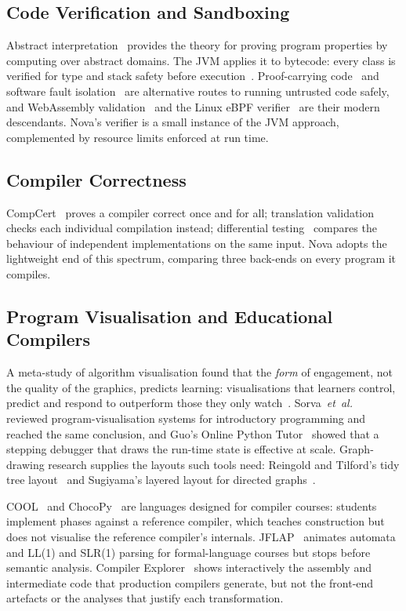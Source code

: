 \documentclass[conference]{IEEEtran}
\begin{document}
\subsection{Code Verification and Sandboxing}
Abstract interpretation~\cite{cousot1977} provides the theory for proving program properties by computing over abstract domains. The JVM applies it to bytecode: every class is verified for type and stack safety before execution~\cite{lindholm2014,leroy2003}. Proof-carrying code~\cite{necula1997} and software fault isolation~\cite{wahbe1993} are alternative routes to running untrusted code safely, and WebAssembly validation~\cite{haas2017} and the Linux eBPF verifier~\cite{gershuni2019} are their modern descendants. Nova's verifier is a small instance of the JVM approach, complemented by resource limits enforced at run time.

\subsection{Compiler Correctness}
CompCert~\cite{leroy2009} proves a compiler correct once and for all; translation validation~\cite{pnueli1998} checks each individual compilation instead; differential testing~\cite{mckeeman1998,yang2011} compares the behaviour of independent implementations on the same input. Nova adopts the lightweight end of this spectrum, comparing three back-ends on every program it compiles.

\subsection{Program Visualisation and Educational Compilers}
A meta-study of algorithm visualisation found that the \emph{form} of engagement, not the quality of the graphics, predicts learning: visualisations that learners control, predict and respond to outperform those they only watch~\cite{hundhausen2002}. Sorva~\emph{et~al.}~\cite{sorva2013} reviewed program-visualisation systems for introductory programming and reached the same conclusion, and Guo's Online Python Tutor~\cite{guo2013} showed that a stepping debugger that draws the run-time state is effective at scale. Graph-drawing research supplies the layouts such tools need: Reingold and Tilford's tidy tree layout~\cite{reingold1981} and Sugiyama's layered layout for directed graphs~\cite{sugiyama1981}.

COOL~\cite{aiken1996} and ChocoPy~\cite{padhye2019} are languages designed for compiler courses: students implement phases against a reference compiler, which teaches construction but does not visualise the reference compiler's internals. JFLAP~\cite{rodger2006} animates automata and LL(1) and SLR(1) parsing for formal-language courses but stops before semantic analysis. Compiler Explorer~\cite{godbolt2020} shows interactively the assembly and intermediate code that production compilers generate, but not the front-end artefacts or the analyses that justify each transformation.
\end{document}
